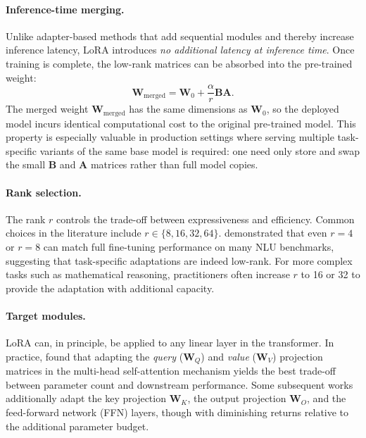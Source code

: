\paragraph{Inference-time merging.}
Unlike adapter-based methods that add sequential modules and thereby
increase inference latency, LoRA introduces \emph{no additional latency
at inference time}.  Once training is complete, the low-rank matrices can
be absorbed into the pre-trained weight:
\begin{equation}
  \label{eq:lora-merge}
  \mathbf{W}_{\text{merged}} = \mathbf{W}_0 + \frac{\alpha}{r}\mathbf{B}\mathbf{A}.
\end{equation}
The merged weight $\mathbf{W}_{\text{merged}}$ has the same dimensions as
$\mathbf{W}_0$, so the deployed model incurs identical computational cost
to the original pre-trained model.  This property is especially valuable
in production settings where serving multiple task-specific variants of
the same base model is required: one need only store and swap the small
$\mathbf{B}$ and $\mathbf{A}$ matrices rather than full model copies.

\paragraph{Rank selection.}
The rank $r$ controls the trade-off between expressiveness and efficiency.
Common choices in the literature include $r \in \{8, 16, 32, 64\}$.
\citet{hu2021lora} demonstrated that even $r = 4$ or $r = 8$ can match
full fine-tuning performance on many NLU benchmarks, suggesting that
task-specific adaptations are indeed low-rank.  For more complex tasks
such as mathematical reasoning, practitioners often increase $r$ to 16
or 32 to provide the adaptation with additional capacity.

\paragraph{Target modules.}
LoRA can, in principle, be applied to any linear layer in the
transformer.  In practice, \citet{hu2021lora} found that adapting the
\emph{query} ($\mathbf{W}_Q$) and \emph{value} ($\mathbf{W}_V$)
projection matrices in the multi-head self-attention mechanism yields
the best trade-off between parameter count and downstream performance.
Some subsequent works additionally adapt the key projection
$\mathbf{W}_K$, the output projection $\mathbf{W}_O$, and the
feed-forward network (FFN) layers, though with diminishing returns
relative to the additional parameter budget.

